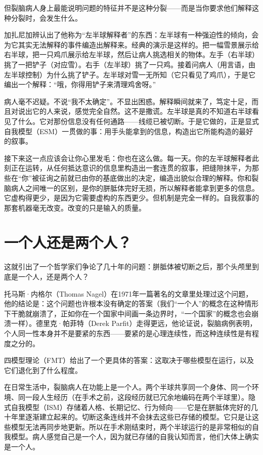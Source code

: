 \documentclass[11pt, twoside, openright]{book}
\begin{document}
但裂脑病人身上最能说明问题的特征并不是这种分裂------而是当你要求他们解释这种分裂时，会发生什么。

加扎尼加辨认出了他称为“左半球解释者”的东西：左半球有一种强迫性的倾向，会为它其实无法解释的事件编造出解释来。经典的演示是这样的。把一幅雪景展示给右半球，把一只鸡爪展示给左半球，然后让病人挑选相关的物体。左手（右半球）挑了一把铲子（对应雪）。右手（左半球）挑了一只鸡。接着问病人（用言语，由左半球控制）为什么挑了铲子。左半球对雪一无所知（它只看见了鸡爪），于是它编出一个解释：“哦，你得用铲子来清理鸡舍呀。”

病人毫不迟疑。不说“我不太确定”。不显出困惑。解释瞬间就来了，笃定十足，而且对说出它的人来说，感觉完全自然。这不是撒谎。左半球是真的不知道右半球看见了什么。它对那份信息没有任何通路------线缆已被切断。于是它做的，正是显式自我模型（ESM）一贯做的事：用手头能拿到的信息，构造出它所能构造的最好的叙事。

接下来这一点应该会让你心里发毛：你也在这么做。每一天。你的左半球解释者此刻正在运转，从任何抵达意识的信息里构造出一套连贯的叙事，把缝隙抹平，为那些在“你”被征询之前就已由你的基底做出的决定，编造出貌似合理的解释。你和裂脑病人之间唯一的区别，是你的胼胝体完好无损，所以解释者能拿到更多的信息。它虚构得更少，是因为它需要虚构的东西更少。但机制是完全一样的。自我叙事的那套机器毫无改变。改变的只是输入的质量。

\section*{一个人还是两个人？}

这就引出了一个哲学家们争论了几十年的问题：胼胝体被切断之后，那个头颅里到底是一个人，还是两个人？

托马斯·内格尔（Thomas Nagel）在1971年一篇著名的文章里处理过这个问题，他的结论是：这个问题也许根本没有确定的答案（我们“一个人”的概念在这种情形下干脆就崩溃了，正如你在一个国家中间画一条边界时，“一个国家”的概念也会崩溃一样）。德里克·帕菲特（Derek Parfit）走得更远，他论证说，裂脑病例表明，个人同一性本身并不是要紧的东西------要紧的是心理连续性，而这种连续性是有程度之分的。

四模型理论（FMT）给出了一个更具体的答案：这取决于哪些模型在运行，以及它们退化到了什么程度。

在日常生活中，裂脑病人在功能上是一个人。两个半球共享同一个身体、同一个环境、同一段人生经历（在手术之前，这段经历就已冗余地编码在两个半球里）。隐式自我模型（ISM）存储着人格、长期记忆、行为倾向------它是在胼胝体完好的几十年里逐渐建立起来的。切断这条连线并不会抹去这些已存储的模型。它只是让这些模型无法再同步地更新。所以在手术刚结束时，两个半球运行的是非常相似的自我模型。病人感觉自己是一个人，因为就已存储的自我认知而言，他们大体上确实是一个人。
\end{document}
